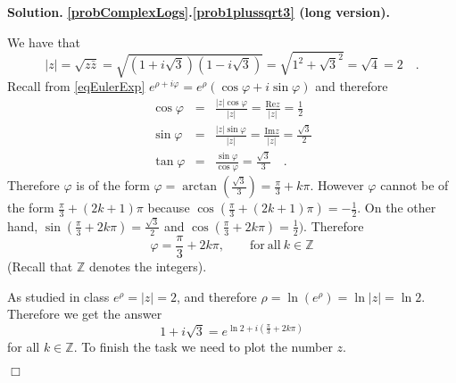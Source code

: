 \documentclass[12pt]{book}
\renewcommand{\Im}{\mathrm{Im}}
\renewcommand{\Re}{\mathrm{Re}}
\newenvironment{solution}{\textbf{Solution.} }{$\Box$}
\newcommand{\optionalDisplay}[1]{}
\begin{document}
\begin{solution} \textbf{\ref{probComplexLogs}.\ref{prob1plussqrt3} (long version).}

We have that 
\[
|z|=\sqrt{z\bar z}= \sqrt{(1+i\sqrt{3})(1-i\sqrt{3})}=\sqrt{1^2+\sqrt{3}^2}=\sqrt{4}=2\quad .
\]
Recall from \eqref{eqEulerExp} $e^{\rho +i \varphi}= e^{\rho}(\cos\varphi+i\sin \varphi) $ and therefore 
\[
\begin{array}{rcl}
\cos \varphi &=& \frac{|z|\cos \varphi}{|z|}= \frac{\Re z}{|z|} =  \frac{1}{2}\\
\sin \varphi &=& \frac{|z|\sin \varphi}{|z|}= \frac{\Im z}{|z|} =  \frac{\sqrt{3}}2\\
\tan \varphi &=& \frac{\sin \varphi}{\cos \varphi}=  \frac{\sqrt{3}}3\quad .
\end{array}
\]
Therefore $\varphi$ is of the form $\varphi =  \arctan \left(\frac{\sqrt{3}}3\right)= \frac{\pi}3+k\pi$. However $\varphi$ cannot be of the form $ \frac{\pi}3+(2k+1)\pi$ because $\cos \left(\frac{\pi}3+(2k+1)\pi\right)=-\frac 12$. On the other hand, $\sin (\frac{\pi}{3}+2k\pi) = \frac{\sqrt{3}}2$ and $\cos (\frac{\pi}{3}+2k\pi) = \frac {1}{2})$. Therefore 
\[
\varphi =\frac{\pi}{3}+2k\pi, \quad \quad \mathrm{for~all~} k\in \mathbb Z
\] 
(Recall that $\mathbb Z$ denotes the integers).

As studied in class $e^{\rho}=|z|=2$, and therefore $\rho = \ln (e^\rho)= \ln |z|=\ln 2 $. Therefore we get the answer
\[
1+i\sqrt{3} = e^{\ln 2 +i \left(\frac{\pi}3+2k\pi  \right) } 
\]
for all $k\in \mathbb Z$. To finish the task we need to plot the number $z$.

\optionalDisplay{
\psset{xunit=1cm,yunit=1cm}
\begin{pspicture*}(-3,-4)(4,4)
\psline[linecolor=gray](-1.5,0)(2.5,0) %
\psline[linecolor=gray](0,-1.5)(0,2.5) %
\rput[l](2.5,0){$\Re z$}
\rput[b](0,2.5){$\Im z$}
\rput[bl](0.03,1.03){$i$}
\rput[bl](1,-0.1){$1$}
\rput[c](0,1){$\bullet$}
\rput[c](1,0){$\bullet$}
\psplot{-1}{0.5}{1 x x mul sub sqrt} 

\psplot[linecolor=red]{0.5}{1}{1 x x mul sub sqrt} 

\psplot{-1}{1}{1 x x mul sub sqrt -1 mul}

\psline(0,0)(0.5,0.866)
\rput[c](0.5,0.866){$\bullet$}
\rput[l](0.47,1){$\frac{z}{|z|}$}
\psline[linestyle=dotted](0.5,0.866)(1,1.74)
\rput[l](1.1,1.81){$z=1+i\sqrt{3} $}
\rput[c](1,1.74){$\bullet$}

\rput[t](-2,-3){$-2-3i$}
\psline[linestyle=dotted](0,0)(-2,-3)
\rput[c](-2,-3){$\bullet$}


\end{pspicture*}}
\end{solution}
\end{document}
